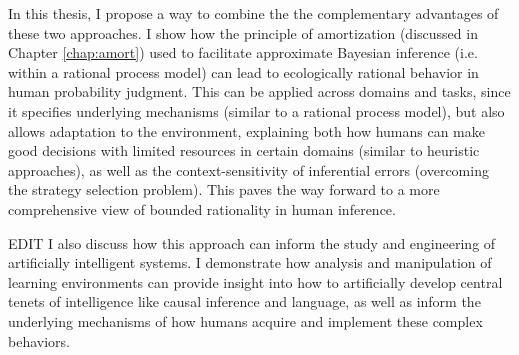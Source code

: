 In this thesis, I propose a way to combine the the complementary advantages of these two approaches. I show how the principle of amortization (discussed in Chapter \ref{chap:amort}) used to facilitate approximate Bayesian inference (i.e. within a rational process model) can lead to ecologically rational behavior in human probability judgment. This can be applied across domains and tasks, since it specifies underlying mechanisms (similar to a rational process model), but also allows adaptation to the environment, explaining both how humans can make good decisions with limited resources in certain domains (similar to heuristic approaches), as well as the context-sensitivity of inferential errors (overcoming the strategy selection problem). This paves the way forward to a more comprehensive view of bounded rationality in human inference. 

EDIT
I also discuss how this approach can inform the study and engineering of artificially intelligent systems. I demonstrate how analysis and manipulation of learning environments can provide insight into how to artificially develop central tenets of intelligence like causal inference and language, as well as inform the underlying mechanisms of how humans acquire and implement these complex behaviors.
